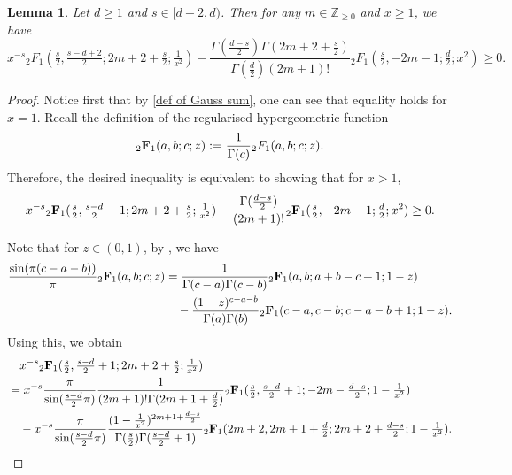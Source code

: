 \documentclass[10pt]{amsart}
\theoremstyle{plain}
\newtheorem{lem}[thm]{Lemma}
\theoremstyle{remark}
\numberwithin{equation}{section}
\begin{document}
\begin{lem} \label{Lem_hypergeometric inequal}
Let $d \ge 1$ and $s \in [d-2,d)$. Then for any $m\in \mathbb{Z}_{ \ge 0 }$ and $x \ge 1$, we have 
\begin{equation}
 x^{-s}  {}_2F_1 ( \tfrac{s}{2},\tfrac{s-d+2}{2}; 2m+2+\tfrac{s}{2}; \tfrac{1}{x^2} ) -   \frac{ \Gamma(\frac{d-s}{2}) \Gamma(2m+2+\frac{s}{2}) }{ \Gamma(\frac{d}{2}) (2m+1)! }   {}_2F_1(\tfrac{s}{2},-2m-1;\tfrac{d}{2};x^2) \ge 0. 
\end{equation} 
\end{lem}
\begin{proof}  
Notice first that by \eqref{def of Gauss sum}, one can see that  equality holds for $x=1$. 
Recall the definition of the regularised hypergeometric function
\begin{equation}
{}_2\textup{\textbf{F}}_1(a,b;c;z):=\frac{1}{\Gamma(c)} {}_2F_1(a,b;c;z). 
\end{equation} 
Therefore, the desired inequality is equivalent to showing that for $x > 1$,  
\begin{align} \label{2.25}
 x^{-s}  {}_2 \textbf{\textup{F}} _1 ( \tfrac{s}{2},\tfrac{s-d}{2}+1; 2m+2+\tfrac{s}{2}; \tfrac{1}{x^2} ) -    \frac{ \Gamma(\frac{d-s}{2})  }{ (2m+1)! }   {}_2\textbf{\textup{F}}_1(\tfrac{s}{2},-2m-1;\tfrac{d}{2};x^2) \ge 0. 
\end{align} 

Note that for $z \in (0,1)$, by \cite[Eq.(15.8.4)]{NIST}, we have 
\begin{align*}
  \frac{ \sin( \pi(c-a-b) ) } { \pi }  {}_2\textbf{\textup{F}} _1(a,b;c;z)&=   \frac{1}{ \Gamma(c-a)\Gamma(c-b) }    {}_2\textbf{\textup{F}} _1(a,b;a+b-c+1;1-z)
   \\
   &\quad - \frac{ (1-z)^{c-a-b} }{ \Gamma(a)\Gamma(b) }     {}_2\textbf{\textup{F}} _1(c-a,c-b;c-a-b+1;1-z). 
\end{align*}
Using this, we obtain 
\begin{align}
\begin{split} \label{2.29}
&\quad x^{-s}  {}_2 \textbf{\textup{F}} _1 ( \tfrac{s}{2},\tfrac{s-d}{2}+1; 2m+2+\tfrac{s}{2}; \tfrac{1}{x^2} )  
\\
&=  x^{-s}  \frac{ \pi }{ \sin(\frac{s-d}{2}\pi) } \frac{1}{(2m+1)! \Gamma(2m+1+\frac{d}{2})} {}_2 \textbf{\textup{F}} _1 ( \tfrac{s}{2},\tfrac{s-d}{2}+1; -2m-\tfrac{d-s}{2}; 1-\tfrac{1}{x^2} )
\\
&\quad - x^{-s}  \frac{ \pi }{ \sin(\frac{s-d}{2}\pi) } \frac{ (1-\frac{1}{x^2})^{ 2m+1+\frac{d-s}{2} } }{ \Gamma(\tfrac{s}{2}) \Gamma(\tfrac{s-d}{2}+1 ) } {}_2 \textbf{\textup{F}} _1 ( 2m+2, 2m+1+\tfrac{d}{2}; 2m+2+\tfrac{d-s}{2}; 1-\tfrac{1}{x^2} ). 
\end{split}
\end{align}


\end{proof}
\end{document}
